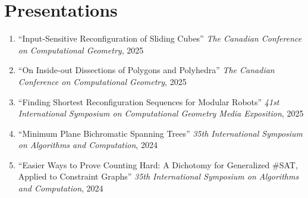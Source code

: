 \documentclass[letterpaper,11pt]{article}
\makeatletter
\newcommand{\resumeSubHeadingListStart}{\begin{itemize}[leftmargin=*]}
\newcommand{\resumeSubheading}[4]{%
  \item[]%
  \begin{tabularx}{\textwidth}{>{\raggedright\arraybackslash}X@{\hspace{0.5em}}r}
    {\bfseries{\textsc{#1}}} & #2 \\[2pt]
    {\small #3}               & {\small #4} \\
  \end{tabularx}%
}
\newcommand{\presentation}[3]{
  \item ``#1'' %
     \emph{#2}, %
      #3%


}
\newcommand{\pdficon}{\faFilePdf}
\makeatother
\begin{document}
\section{Presentations}
\begin{enumerate}
  \presentation{Input-Sensitive Reconfiguration of Sliding Cubes}{The Canadian Conference on Computational Geometry}{2025} \vspace{-.5em}  
  \presentation{On Inside-out Dissections of Polygons and Polyhedra}{The Canadian Conference on Computational Geometry}{2025} \vspace{-.5em}  
  \presentation{Finding Shortest Reconfiguration Sequences for Modular Robots}{41st International Symposium on Computational Geometry Media Exposition}{2025} \vspace{-.5em}  
  \presentation{Minimum Plane Bichromatic Spanning Trees}{35th International Symposium on Algorithms and Computation}{2024} \vspace{-.5em}  
  \presentation{Easier Ways to Prove Counting Hard: A Dichotomy for Generalized \#SAT, Applied to Constraint Graphs}{35th International Symposium on Algorithms and Computation}{2024} \vspace{-.5em}  

\end{enumerate}
\end{document}
